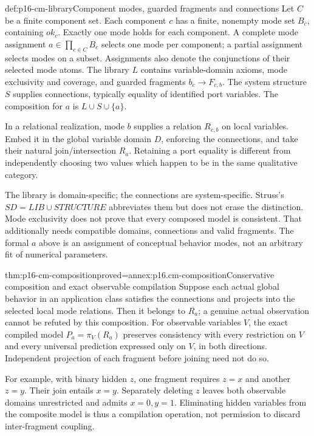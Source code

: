 \begin{hbdefinition}{def:p16-cm-library}{Component modes, guarded fragments and connections}
Let \(C\) be a finite component set. Each component \(c\) has a finite,
nonempty mode set \(B_c\), containing \(ok_c\). Exactly one mode holds
for each component. A complete mode assignment \(a\in\prod_{c\in C}B_c\)
selects one mode per component; a partial assignment selects modes on a subset.
Assignments also denote the conjunctions of their selected mode atoms.
The library \(L\) contains variable-domain axioms, mode exclusivity and
coverage, and guarded fragments \(b_c\to F_{c,b}\). The system structure
\(S\) supplies connections, typically equality of identified port variables.
The composition for \(a\) is \(L\cup S\cup\{a\}\).

In a relational realization, mode \(b\) supplies a relation \(R_{c,b}\)
on local variables. Embed it in the global variable domain \(D\), enforcing
the connections, and take their natural join/intersection \(R_a\).
Retaining a port equality is different from independently choosing two
values which happen to be in the same qualitative category.
\end{hbdefinition}

The library is domain-specific; the connections are system-specific.
Struss's \(SD=LIB\cup STRUCTURE\) abbreviates them but does not erase
the distinction. Mode exclusivity does not prove that every composed model
is consistent. That additionally needs compatible domains, connections and
valid fragments. The formal \(a\) above is an assignment of conceptual
behavior modes, not an arbitrary fit of numerical parameters.

\begin{hbtheorem}{thm:p16-cm-composition}{proved=annex:p16.cm-composition}{Conservative composition and exact observable compilation}
Suppose each actual global behavior in an application class satisfies the
connections and projects into the selected local mode relations. Then it
belongs to \(R_a\); a genuine actual observation cannot be refuted by this
composition. For observable variables \(V\), the exact compiled model
\(P_a=\pi_V(R_a)\) preserves consistency with every restriction on \(V\)
and every universal prediction expressed only on \(V\), in both directions.
Independent projection of each fragment before joining need not do so.
\end{hbtheorem}

For example, with binary hidden \(z\), one fragment requires \(z=x\)
and another \(z=y\). Their join entails \(x=y\). Separately deleting
\(z\) leaves both observable domains unrestricted and admits \(x=0,y=1\).
Eliminating hidden variables from the composite model is thus a compilation
operation, not permission to discard inter-fragment coupling.

